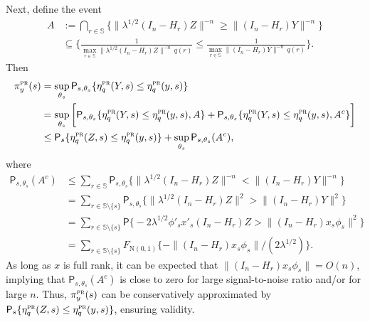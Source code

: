 \documentclass[12pt]{article}
\def\SS{\mathbb{S}}
\def\prob{\mathsf{P}}
\begin{document}
Next, define the event
\begin{align*}
A &:= \bigcap_{r\in\SS}\Big\{ \|\lambda^{1/2}(I_n - H_r)Z\|^{-n} \ge \|(I_n - H_r)Y\|^{-n} \Big\} \\
& \subseteq \bigg\{ \frac{1}{\max_{r \in \SS} \|\lambda^{1/2}(I_n - H_r)Z\|^{-n} \, q(r)} \le \frac{1}{\max_{r \in \SS} \|(I_n - H_r)Y\|^{-n} \, q(r)} \bigg\}.
\end{align*}
Then
\begin{align*}
\pi_y^\text{\sc pr}(s) & = \sup_{\theta_s}\prob_{s,\theta_{s}}\{ \eta_q^\text{\sc pr}(Y,s) \leq \eta_q^\text{\sc pr}(y,s) \} \\
& = \sup_{\theta_s}\bigg[\prob_{s,\theta_{s}}\{ \eta_q^\text{\sc pr}(Y,s) \leq \eta_q^\text{\sc pr}(y,s), A \} + \prob_{s,\theta_{s}}\{ \eta_q^\text{\sc pr}(Y,s) \leq \eta_q^\text{\sc pr}(y,s), A^c\} \bigg] \\
& \le \prob_{s}\{ \eta_q^\text{\sc pr}(Z,s) \leq \eta_q^\text{\sc pr}(y,s) \} + \sup_{\theta_s}\prob_{s,\theta_{s}}(A^c),
\end{align*}
where
\begin{align*}
\prob_{s,\theta_{s}}(A^c) & \le \sum_{r\in\SS}\prob_{s,\theta_{s}}\Big\{ \|\lambda^{1/2}(I_n - H_r)Z\|^{-n} < \|(I_n - H_r)Y\|^{-n} \Big\} \\
& = \sum_{r\in\SS\setminus\{s\}}\prob_{s,\theta_{s}}\Big\{ \|\lambda^{1/2}(I_n - H_r)Z\|^2 > \|(I_n - H_r)Y\|^2 \Big\} \\
& = \sum_{r\in\SS\setminus\{s\}}\prob\Big\{ -2\lambda^{1/2} \phi'_s x'_s(I_n - H_r) Z > \|(I_n - H_r)x_s\phi_s\|^2 \Big\} \\
& = \sum_{r\in\SS\setminus\{s\}} F_{\text{N}(0,1)}\Big\{ -\|(I_n - H_r)x_s\phi_s\| / (2\lambda^{1/2}) \Big\}.
\end{align*}
As long as $x$ is full rank, it can be expected that $\|(I_n - H_r)x_s\phi_s\| = O(n)$, implying that $\prob_{s,\theta_{s}}(A^c)$ is close to zero for large signal-to-noise ratio and/or for large $n$.  Thus, $\pi_y^\text{\sc pr}(s)$ can be conservatively approximated by $\prob_{s}\{ \eta_q^\text{\sc pr}(Z,s) \leq \eta_q^\text{\sc pr}(y,s) \}$, ensuring validity.









\end{document}
